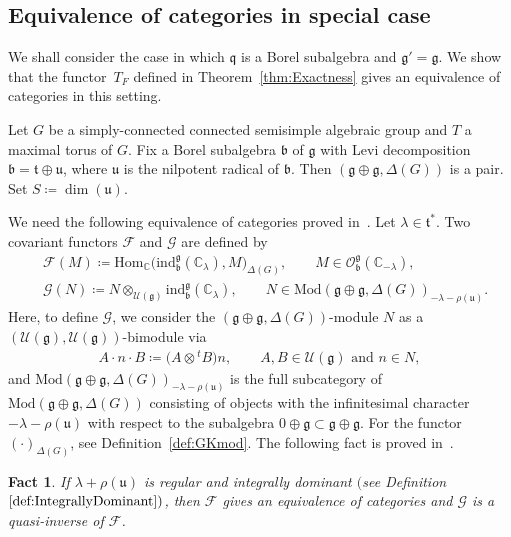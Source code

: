 \documentclass[10pt,a4paper]{amsart}
\numberwithin{equation}{section}
\newtheorem{Fact}[Theorem]{Fact}
\theoremstyle{definition}
\newcommand{\Hom}{\mathrm{Hom}}
\newcommand{\BasicRing}[1]{\mathbb{#1}}
\newcommand{\CC}{\BasicRing{C}}
\newcommand{\Mod}{\mathrm{Mod}}
\newcommand{\lieC}[1]{\mathfrak{#1}}
\newcommand{\lie}[1]{\mathfrak{#1}}
\newcommand{\univ}[1]{\mathcal{U}(\lieC{#1})}
\newcommand{\ind}[2]{\mathrm{ind}^{\lieC{#1}}_{\lieC{#2}}}
\newcommand{\BGGcat}[2]{\mathcal{O}_{\lie{#2}}^{\lie{#1}}}
\newcommand{\rhog}[1]{\rho(#1)}
\begin{document}
\subsection{Equivalence of categories in special case}

We shall consider the case in which $\lie{q}$ is a Borel subalgebra and $\lie{g'} = \lie{g}$.
We show that the functor~$T_F$ defined in Theorem~\ref{thm:Exactness} gives an equivalence of categories in this setting.

Let $G$ be a simply-connected connected semisimple algebraic group and $T$ a maximal torus of $G$.
Fix a Borel subalgebra $\lie{b}$ of $\lie{g}$ with Levi decomposition $\lie{b}=\lie{t}\oplus \lie{u}$, where $\lie{u}$ is the nilpotent radical of $\lie{b}$.
Then $(\lie{g\oplus g}, \Delta(G))$ is a pair.
Set $S\coloneq \dim(\lie{u})$.

\newcommand{\functF}{\mathcal{F}}
\newcommand{\functG}{\mathcal{G}}

We need the following equivalence of categories proved in~\cite[Theorem~5.9]{BeGe80_projective_functor}.
Let $\lambda \in \lie{t}^*$.
Two covariant functors $\functF$ and $\functG$ are defined by
\begin{align*}
	&\functF(M)\coloneq \Hom_{\CC}\bigl(\ind{g}{b}(\CC_{\lambda}), M\bigr)_{\Delta(G)}, \qquad M \in \BGGcat{g}{b}(\CC_{-\lambda}), \\
	&\functG(N)\coloneq N \otimes_{\univ{g}} \ind{g}{b}(\CC_{\lambda}), \qquad N \in \Mod(\lie{g\oplus g}, \Delta(G))_{-\lambda-\rhog{\lie{u}}}.
\end{align*}
Here, to define $\functG$, we consider the $(\lie{g}\oplus \lie{g}, \Delta(G))$-module $N$
as a $(\univ{g}, \univ{g})$-bimodule via
\begin{align*}
	A\cdot n \cdot B \coloneq \bigl(A \otimes {}^t\!B\bigr)n, \qquad A,B \in \univ{g} \text{ and }n \in N,
\end{align*}
and $\Mod(\lie{g\oplus g}, \Delta(G))_{-\lambda-\rhog{\lie{u}}}$ is the full subcategory of $\Mod(\lie{g\oplus g}, \Delta(G))$
consisting of objects with the infinitesimal character $-\lambda-\rhog{\lie{u}}$ with respect to the subalgebra $0\oplus \lie{g}\subset \lie{g\oplus g}$.
For the functor $(\cdot)_{\Delta(G)}$, see Definition~\ref{def:GKmod}.
The following fact is proved in~\cite[Theorem~5.9]{BeGe80_projective_functor}.

\begin{Fact}\label{fact:BGequivalence}
	If $\lambda+\rhog{\lie{u}}$ is regular and integrally dominant $($see Definition $\ref{def:IntegrallyDominant})$,
	then $\functF$ gives an equivalence of categories and $\functG$ is a quasi-inverse of $\functF$.
\end{Fact}
\end{document}
